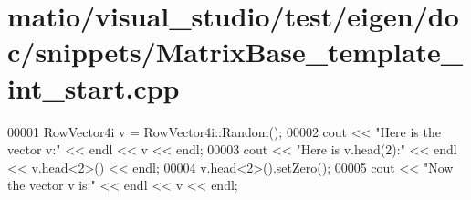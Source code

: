 \hypertarget{matio_2visual__studio_2test_2eigen_2doc_2snippets_2_matrix_base__template__int__start_8cpp_source}{}\section{matio/visual\+\_\+studio/test/eigen/doc/snippets/\+Matrix\+Base\+\_\+template\+\_\+int\+\_\+start.cpp}
\label{matio_2visual__studio_2test_2eigen_2doc_2snippets_2_matrix_base__template__int__start_8cpp_source}

\begin{DoxyCode}
00001 RowVector4i v = RowVector4i::Random();
00002 cout << \textcolor{stringliteral}{"Here is the vector v:"} << endl << v << endl;
00003 cout << \textcolor{stringliteral}{"Here is v.head(2):"} << endl << v.head<2>() << endl;
00004 v.head<2>().setZero();
00005 cout << \textcolor{stringliteral}{"Now the vector v is:"} << endl << v << endl;
\end{DoxyCode}
